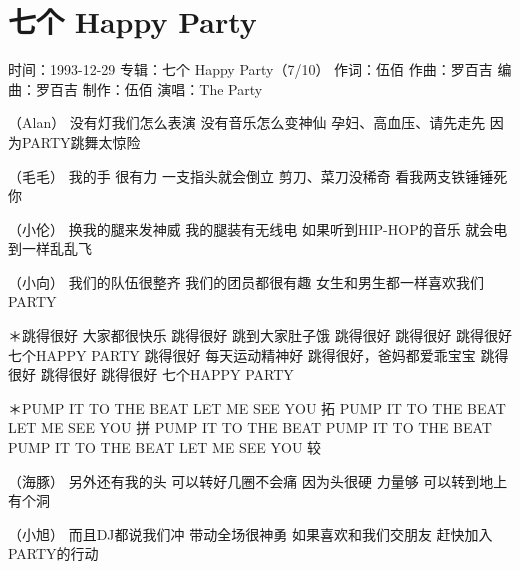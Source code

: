 \documentclass[UTF8,a4paper,oneside,twocolumn,12pt]{ctexbook}
\newcommand{\infopair}[2]{\textbullet #1：#2}
\newcommand{\zc}[1][伍佰]{\infopair{作词}{#1}}
\newcommand{\zq}[1][伍佰]{\infopair{作曲}{#1}}
\newcommand{\bq}[1][伍佰]{\infopair{编曲}{#1}}
\newcommand{\zj}[1]{\infopair{专辑}{#1}}
\newcommand{\zz}[1]{\infopair{制作}{#1}}
\newcommand{\sj}[1]{\infopair{时间}{#1}}
\newenvironment{info}{\begin{flushleft}\kaishu
	}
	{\end{flushleft}\normalsize\yahei\par}
\newenvironment{lyric}{
	}
{}
\begin{document}
\section{七个 Happy Party}
\begin{info}
	\sj{1993-12-29}
	\zj{七个 Happy Party（7/10）}
	\zc
	\zq[罗百吉]
	\bq[罗百吉]
	\zz{伍佰}
	\infopair{演唱}{The Party}
\end{info}
\begin{lyric}
	（Alan）
	没有灯我们怎么表演 没有音乐怎么变神仙
	孕妇、高血压、请先走先 因为PARTY跳舞太惊险

	（毛毛）
	我的手 很有力 一支指头就会倒立
	剪刀、菜刀没稀奇 看我两支铁锤锤死你

	（小伦）
	换我的腿来发神威 我的腿装有无线电
	如果听到HIP-HOP的音乐 就会电到一样乱乱飞

	（小向）
	我们的队伍很整齐 我们的团员都很有趣
	女生和男生都一样喜欢我们PARTY

	＊跳得很好 大家都很快乐 跳得很好 跳到大家肚子饿
	跳得很好 跳得很好 跳得很好 七个HAPPY PARTY
	跳得很好 每天运动精神好 跳得很好，爸妈都爱乖宝宝
	跳得很好 跳得很好 跳得很好 七个HAPPY PARTY

	＊PUMP IT TO THE BEAT LET ME SEE YOU 拓
	PUMP IT TO THE BEAT LET ME SEE YOU 拼
	PUMP IT TO THE BEAT PUMP IT TO THE BEAT
	PUMP IT TO THE BEAT LET ME SEE YOU 较

	（海豚）
	另外还有我的头 可以转好几圈不会痛
	因为头很硬 力量够 可以转到地上有个洞

	（小旭）
	而且DJ都说我们冲 带动全场很神勇
	如果喜欢和我们交朋友 赶快加入PARTY的行动
\end{lyric}
\end{document}

